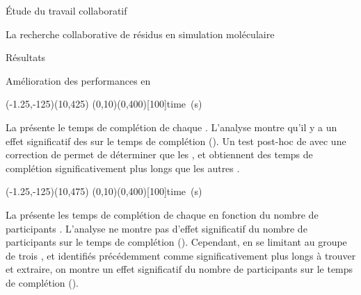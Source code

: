 \documentclass[myfrancais]{mythesis}
\begin{document}
\begin{mypart}{Étude du travail collaboratif}
\begin{mychapter}{La recherche collaborative de résidus en simulation moléculaire}
\begin{mysection}{Résultats}
\begin{mysubsection}{Amélioration des performances en }
\begin{myfigure}
						\begin{myps}(-1.25,-125)(10,425)
							\myaxes(0,10){}(0,400)[100]{time~(s)}
						\end{myps}
					\end{myfigure}

					La  présente le temps de complétion  de chaque  .
					L'analyse montre qu'il y a un effet significatif des   sur le temps de complétion  ().
					Un test post-hoc de  avec une correction de  permet de déterminer que les  ,  et  obtiennent des temps de complétion significativement plus longs que les autres .

					\begin{myfigure}
						\begin{myps}(-1.25,-125)(10,475)
							\myaxes(0,10){}(0,400)[100]{time~(s)}
						\end{myps}
					\end{myfigure}

					La  présente les temps de complétion  de chaque   en fonction du nombre de participants .
					L'analyse ne montre pas d'effet significatif du nombre de participants  sur le temps de complétion  ().
					Cependant, en se limitant au groupe de trois  ,  et  identifiés précédemment comme significativement plus longs à trouver et extraire, on montre un effet significatif du nombre de participants  sur le temps de complétion  ().


\end{mysubsection}
\end{mysection}
\end{mychapter}
\end{mypart}
\end{document}
